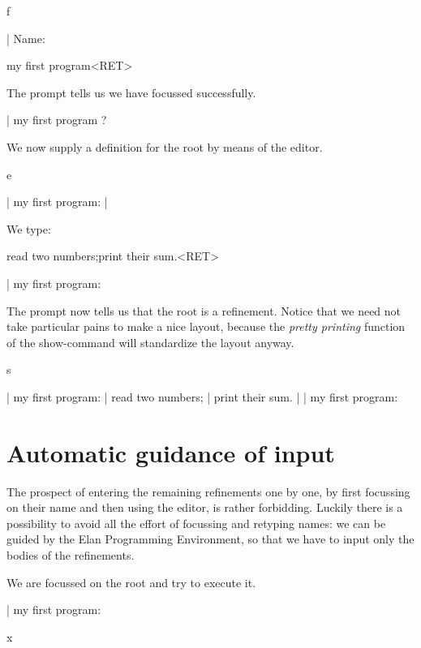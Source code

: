 \begin{elan}
        f

|       Name:\cursor

        my first program<RET>
\end{elan}

\noindent
The prompt tells us we have focussed successfully.

\begin{elan}
|       my first program ?\cursor
\end{elan}

\noindent
We now supply a definition for the root by means of the editor.

\begin{elan}
        e

|       my first program:
|       \cursor
\end{elan}

\noindent
We type:

\begin{elan}
        read two numbers;print their sum.<RET>

|       my first program:\cursor
\end{elan}

\noindent
The prompt now tells us that the root is a refinement.
Notice that we need not take particular pains to make a
nice layout, because the {\em pretty printing} function
of the show-command will standardize the layout anyway.

\begin{elan}
        s

|       my first program:
|         read two numbers;
|         print their sum.
|
|       my first program:\cursor
\end{elan}

\section{Automatic guidance of input}

The prospect of entering the remaining refinements one by one,
by first focussing on their name and then using the editor, is
rather forbidding.
Luckily there is a possibility to avoid all the effort of focussing
and retyping names: we can be guided by the Elan Programming Environment,
so that we have to input only the bodies of the refinements.

We are focussed on the root and try to execute it.

\begin{elan}
|       my first program:\cursor

        x
\end{elan}

